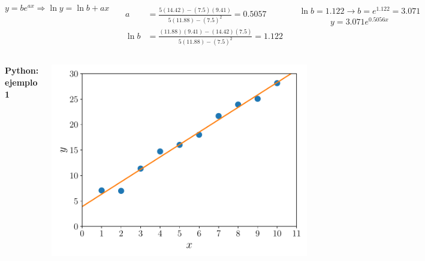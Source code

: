 \documentclass[9pt, aspectratio=169]{beamer}
\begin{document}
\begin{frame}
\begin{columns}
\cx
    \[ y = b e^{ax} \Rightarrow \ln y = \ln b + a x \]

\begin{align*}
    a &= \frac{5 (14.42) - (7.5)(9.41)}{5 (11.88) - (7.5)^2} = 0.5057 \\
    \ln b&= \frac{(11.88)(9.41) - (14.42)(7.5)}{5 (11.88) - (7.5)^2} = 1.122 
\end{align*}

\cx
$\ln b = 1.122 \rightarrow b = e^{1.122} = 3.071$
\[ y = 3.071 e^{0.5056 x} \]
\end{columns}
\end{frame}

\begin{frame}[fragile]
\begin{columns}

\textbf{Python: ejemplo 1}


\cx
\begin{center}
\includegraphics[scale=0.40]{code/ejem-01.pdf}
\end{center}

\end{columns}
\end{frame}
\end{document}
